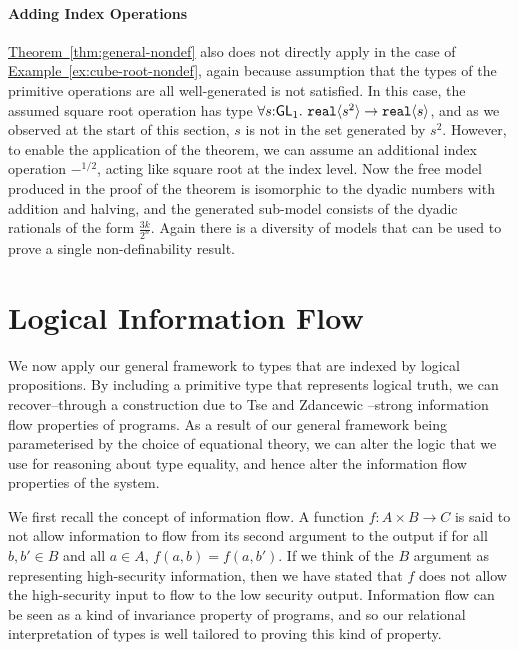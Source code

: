 \documentclass{sigplanconf}
\newcommand{\SynGL}[1]{\mathsf{GL}_#1}
\newcommand{\tyPrim}[2]{\textup{\texttt{#1}}\langle #2 \rangle}
\newcommand{\thmref}[1]{\hyperref[#1]{Theorem~\ref*{#1}}}
\newcommand{\exref}[1]{\hyperref[#1]{Example~\ref*{#1}}}
\theoremstyle{examplestyle}
\theoremstyle{restatementstyle}
\begin{document}
\paragraph{Adding Index Operations} \thmref{thm:general-nondef} also
does not directly apply in the case of \exref{ex:cube-root-nondef},
again because assumption that the types of the primitive operations
are all well-generated is not satisfied. In this case, the assumed
square root operation has type $\forall
s\mathord:\SynGL{1}.~\tyPrim{real}{s^2} \to \tyPrim{real}{s}$, and as
we observed at the start of this section, $s$ is not in the set
generated by $s^2$. However, to enable the application of the theorem,
we can assume an additional index operation $-^{1/2}$, acting like
square root at the index level. Now the free model produced in the
proof of the theorem is isomorphic to the dyadic numbers with addition
and halving, and the generated sub-model consists of the dyadic
rationals of the form $\frac{3k}{2^n}$. Again there is a diversity of
models that can be used to prove a single non-definability result.

\section{Logical Information Flow}
\label{sec:information-flow}

\newcommand{\infoflow}{\mathit{Log}}

We now apply our general framework to types that are indexed by
logical propositions. By including a primitive type that represents
logical truth, we can recover--through a construction due to Tse and
Zdancewic \cite{tse04translating}--strong information flow properties
of programs. As a result of our general framework being parameterised
by the choice of equational theory, we can alter the logic that we use
for reasoning about type equality, and hence alter the information
flow properties of the system. 

We first recall the concept of information flow. A function $f : A
\times B \to C$ is said to not allow information to flow from its
second argument to the output if for all $b,b' \in B$ and all $a \in
A$, $f(a,b) = f(a,b')$. If we think of the $B$ argument as
representing high-security information, then we have stated that $f$
does not allow the high-security input to flow to the low security
output. Information flow can be seen as a kind of invariance property
of programs, and so our relational interpretation of types is well
tailored to proving this kind of property.
\end{document}
